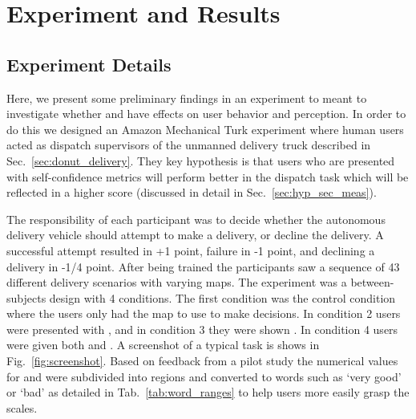 \section{Experiment and Results} \label{sec:results}
\subsection{Experiment Details}
    Here, we present some preliminary findings in an experiment to meant to investigate whether \xQ{} and \xO{} have effects on user behavior and perception. In order to do this we designed an Amazon Mechanical Turk experiment where human users acted as dispatch supervisors of the unmanned delivery truck described in Sec.~\ref{sec:donut_delivery}. They key hypothesis is that users who are presented with self-confidence metrics will perform better in the dispatch task which will be reflected in a higher score (discussed in detail in Sec.~\ref{sec:hyp_sec_meas}).

    The responsibility of each participant was to decide whether the autonomous delivery vehicle should attempt to make a delivery, or decline the delivery. A successful attempt resulted in +1 point, failure in -1 point, and declining a delivery in -1/4 point. After being trained the participants saw a sequence of 43 different delivery scenarios with varying maps. The experiment was a between-subjects design with 4 conditions. The first condition was the control condition where the users only had the map to use to make decisions. In condition 2 users were presented with \xQ{}, and in condition 3 they were shown \xP{}. In condition 4 users were given both \xQ{} and \xP. A screenshot of a typical task is shows in Fig.~\ref{fig:screenshot}. Based on feedback from a pilot study the numerical values for \xQ{} and \xP{} were subdivided into regions and converted to words such as `very good' or `bad' as detailed in Tab.~\ref{tab:word_ranges} to help users more easily grasp the scales.

